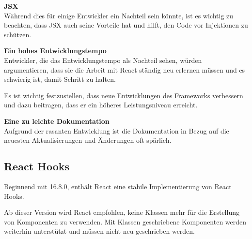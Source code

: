 \textbf{JSX}\\
Während dies für einige Entwickler ein Nachteil sein könnte, ist es wichtig zu beachten, dass JSX auch seine Vorteile hat und hilft, den Code vor Injektionen zu schützen.{\cite{R02}}
\newline

\textbf{Ein hohes Entwicklungstempo}\\
Entwickler, die das Entwicklungstempo als Nachteil sehen, würden argumentieren, dass sie die Arbeit mit React ständig neu erlernen müssen und es schwierig ist, damit Schritt zu halten.

Es ist wichtig festzustellen, dass neue Entwicklungen des Frameworks verbessern und dazu beitragen, dass er ein höheres Leistungsniveau erreicht.
\newline

\textbf{Eine zu leichte Dokumentation}\\
Aufgrund der rasanten Entwicklung ist die Dokumentation in Bezug auf die neuesten Aktualisierungen und Änderungen oft spärlich.{\cite{R01}}

\subsection{React Hooks}
Beginnend mit 16.8.0, enthält React eine stabile Implementierung von React Hooks.

Ab dieser Version wird React empfohlen, keine Klassen mehr für die Erstellung von Komponenten zu verwenden.
Mit Klassen geschriebene Komponenten werden weiterhin unterstützt und müssen nicht neu geschrieben werden.
{\cite{R05}}

